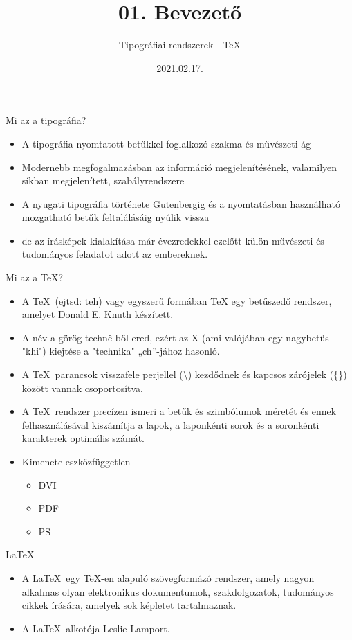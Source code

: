 \documentclass[11pt]{beamer}
\author{Tipográfiai rendszerek - \TeX}
\title{01. Bevezető}
\date{2021.02.17.}
\begin{document}
\begin{frame}
\titlepage
\end{frame}


\begin{frame}{Mi az a tipográfia?}
\begin{itemize}
\item A tipográfia nyomtatott betűkkel foglalkozó szakma és művészeti ág
\item Modernebb megfogalmazásban az információ megjelenítésének, valamilyen síkban megjelenített, szabályrendszere
\item A nyugati tipográfia története Gutenbergig és a nyomtatásban használható mozgatható betűk feltalálásáig nyúlik vissza
\item de az írásképek kialakítása már évezredekkel ezelőtt külön művészeti és tudományos feladatot adott az embereknek.
\end{itemize}
\end{frame}

\begin{frame}{Mi az a \TeX?}
\begin{itemize}
\item A \TeX \ (ejtsd: teh) vagy egyszerű formában TeX egy betűszedő rendszer, amelyet Donald E. Knuth készített.
\item A név a görög technê-ből ered, ezért az X (ami valójában egy nagybetűs "khi") kiejtése a "technika" „ch”-jához hasonló.
\item A \TeX \ parancsok visszafele perjellel (\textbackslash) kezdődnek és kapcsos zárójelek (\{\}) között vannak csoportosítva.
\item A \TeX \ rendszer precízen ismeri a betűk és szimbólumok méretét és ennek felhasználásával kiszámítja a lapok, a laponkénti sorok és a soronkénti karakterek optimális számát.
\item Kimenete eszközfüggetlen
	\begin{itemize}
	\item DVI
	\item PDF
	\item PS
	\end{itemize}
\end{itemize}
\end{frame}

\begin{frame}{\LaTeX}
\begin{itemize}
\item A \LaTeX \ egy \TeX-en alapuló szövegformázó rendszer, amely nagyon alkalmas olyan elektronikus dokumentumok, szakdolgozatok, tudományos cikkek írására, amelyek sok képletet tartalmaznak. 
\item A \LaTeX \ alkotója Leslie Lamport.
\end{itemize}
\end{frame}
\end{document}
